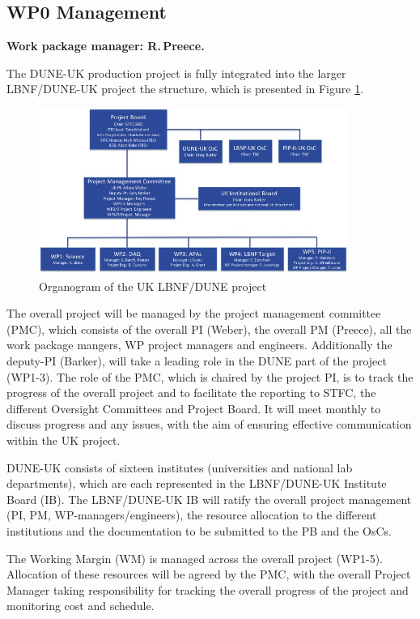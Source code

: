 \subsection{WP0 Management}

{\bf Work package manager: R.\,Preece.}

The DUNE-UK production project is fully integrated into the larger LBNF/DUNE-UK project the structure, which is presented in Figure \ref{fig:organogram}. 
\begin{figure}[htb]
    \centering
    \includegraphics[width=0.9\textwidth]{figs/organogram.jpg}
    \caption{Organogram of the UK LBNF/DUNE project}
    \label{fig:organogram}
\end{figure}

The overall project will be managed by the project management committee (PMC), which consists of the overall PI (Weber), the overall PM (Preece), all the work package mangers, WP project managers and engineers. Additionally the deputy-PI (Barker), will take a leading role in the DUNE part of the project (WP1-3). The role of the PMC, which is chaired by the project PI, is to track the progress of the overall project and to facilitate the reporting to STFC, the different Oversight Committees and Project Board. It will meet monthly to discuss progress and any issues, with the aim of ensuring effective communication within the UK project. 

DUNE-UK consists of sixteen institutes (universities and national lab departments), which are each represented in the  LBNF/DUNE-UK Institute Board (IB). The LBNF/DUNE-UK IB will ratify the overall project management (PI, PM, WP-managers/engineers), the resource allocation to the different institutions and the documentation to be submitted to the PB and the OsCs.

The Working Margin (WM) is managed across the overall project (WP1-5). Allocation of these resources will be agreed by the PMC, with the overall Project Manager taking responsibility for tracking the overall progress of the project and monitoring cost and schedule. 

